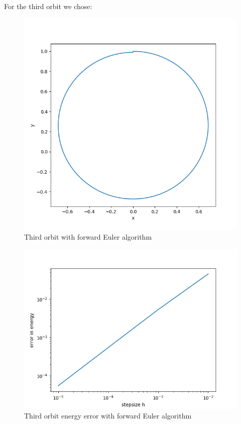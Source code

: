 \documentclass[11pt, a4paper, reqno]{scrartcl}
\begin{document}
    		For the third orbit we chose:
    		\begin{figure}[H]
        		   
    		\end{figure}
    		
    		\begin{figure}[H]
    			\includegraphics[width=.5\paperwidth]{figure_3.png}
    			\caption{Third orbit with forward Euler algorithm}
    		\end{figure}
    		
    		\begin{figure}[H]
    			\includegraphics[width=.5\paperwidth]{figure_3_2.png}
    			\caption{Third orbit energy error with forward Euler algorithm}
    		\end{figure}
    		
\end{document}
